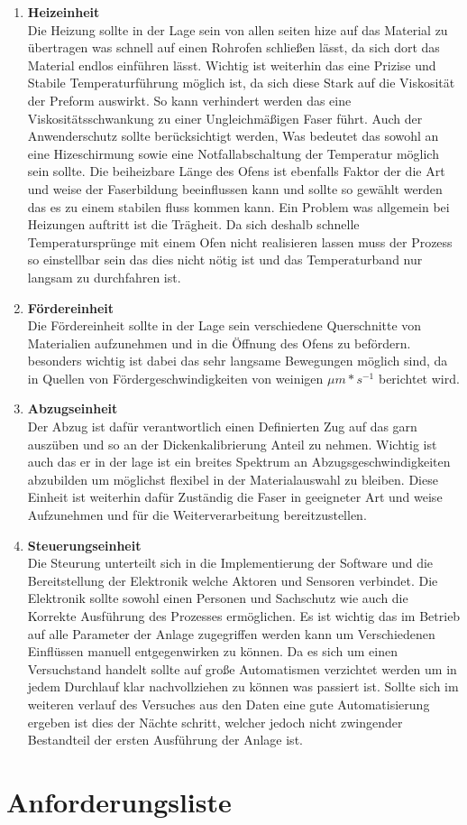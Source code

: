 \begin{enumerate}[label=(\alph*)]
    \item \textbf{Heizeinheit} \\
    Die Heizung sollte in der Lage sein von allen seiten hize auf das Material zu übertragen was schnell auf einen Rohrofen schließen lässt, da sich dort das Material endlos einführen lässt. Wichtig ist weiterhin das eine Prizise und Stabile Temperaturführung möglich ist, da sich diese Stark auf die Viskosität der Preform auswirkt. So kann verhindert werden das eine Viskositätsschwankung zu einer Ungleichmäßigen Faser führt. Auch der Anwenderschutz sollte berücksichtigt werden, Was bedeutet das sowohl an eine Hizeschirmung sowie eine Notfallabschaltung der Temperatur möglich sein sollte. Die beiheizbare Länge des Ofens ist ebenfalls Faktor der die Art und weise der Faserbildung beeinflussen kann und sollte so gewählt werden das es zu einem stabilen fluss kommen kann. Ein Problem was allgemein bei Heizungen auftritt ist die Trägheit. Da sich deshalb schnelle Temperatursprünge mit einem Ofen nicht realisieren lassen muss der Prozess so einstellbar sein das dies nicht nötig ist und das Temperaturband nur langsam zu durchfahren ist. 
    \item \textbf{Fördereinheit}\\
    Die Fördereinheit sollte in der Lage sein verschiedene Querschnitte von Materialien aufzunehmen und in die Öffnung des Ofens zu befördern. besonders wichtig ist dabei das sehr langsame Bewegungen möglich sind, da in  Quellen von Fördergeschwindigkeiten von weinigen $\mu m *s^{-1}$ \cite{Zhao.2016} berichtet wird.
    \item \textbf{Abzugseinheit}\\
    Der Abzug ist dafür verantwortlich einen Definierten Zug auf das garn auszüben und so an der Dickenkalibrierung Anteil  zu nehmen. Wichtig ist auch das er in der lage ist ein breites Spektrum an Abzugsgeschwindigkeiten abzubilden um möglichst flexibel in der Materialauswahl zu bleiben. Diese Einheit ist weiterhin dafür Zuständig die Faser in geeigneter Art und weise Aufzunehmen und für die Weiterverarbeitung bereitzustellen. 
    \item \textbf{Steuerungseinheit}\\
    Die Steurung unterteilt sich in die Implementierung der Software und die Bereitstellung der Elektronik welche Aktoren und Sensoren verbindet. Die Elektronik sollte sowohl einen Personen und Sachschutz wie auch die Korrekte Ausführung des Prozesses ermöglichen. Es ist wichtig das im Betrieb auf alle Parameter der Anlage zugegriffen werden kann um Verschiedenen Einflüssen manuell entgegenwirken zu können. Da es sich um einen Versuchstand handelt sollte auf große Automatismen verzichtet werden um in jedem Durchlauf klar nachvollziehen zu können was passiert ist. Sollte sich im weiteren verlauf des Versuches aus den Daten eine gute Automatisierung ergeben ist dies der Nächte schritt, welcher jedoch nicht zwingender Bestandteil der ersten Ausführung der Anlage ist.
   
\end{enumerate}

\section{Anforderungsliste}
